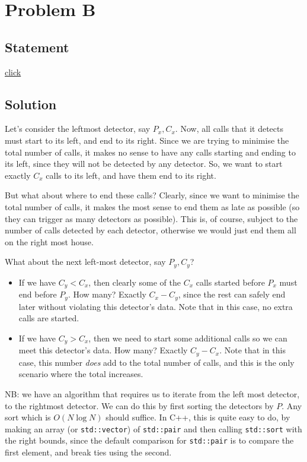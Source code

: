\section{Problem B}
	\subsection{Statement}
		\href{http://foobar.iiitd.edu.in/contest/team/problem.php?id=528}{click}

	\subsection{Solution}
		Let's consider the leftmost detector, say $P_x, C_x$. Now, all calls that it detects
		must start to its left, and end to its right. Since we are trying to minimise the total number
		of calls, it makes no sense to have any calls starting and ending to its left, since they
		will not be detected by any detector.
		So, we want to start exactly $C_x$ calls to its left, and have them end to its right.

		But what about where to end these calls? Clearly, since we want to minimise the total number
		of calls, it makes the most sense to end them as late as possible (so they can trigger
		as many detectors as possible). This is, of course, subject to the number of calls detected
		by each detector, otherwise we would just end them all on the right most house.

		What about the next left-most detector, say $P_y, C_y$?
		\begin{itemize}
		\item If we have $C_y < C_x$, then clearly some of the $C_x$ calls started before $P_x$
		must end before $P_y$. How many? Exactly $C_x - C_y$, since the rest can safely end later
		without violating this detector's data. Note that in this case, no extra calls are started.

		\item If we have $C_y > C_x$, then we need to start some additional calls so we can meet this
		detector's data. How many? Exactly $C_y - C_x$. Note that in this case, this number \emph{does}
		add to the total number of calls, and this is the only scenario where the total increases.
		\end{itemize}

		NB: we have an algorithm that requires us to iterate from the left most detector, to the 
		rightmost detector. We can do this by first sorting the detectors by $P$. Any sort which is
		$O(N\log N)$ should suffice. In C++, this is quite easy to do, by making an array
		(or \verb|std::vector|) of \verb|std::pair| and then calling \verb|std::sort| with the right
		bounds, since the default comparison for \verb|std::pair| is to compare the first element, and
		break ties using the second. 